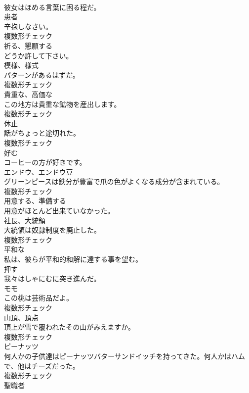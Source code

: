 \documentclass[8pt]{extreport}
\begin{document}
\begin{CJK}{UTF8}{min}
\\	彼女はほめる言葉に困る程だ。	
\\	[名詞]	患者	
\\	辛抱しなさい。	
\\	複数形チェック
\\	[動詞]	祈る、懇願する	
\\	どうか許して下さい。	
\\	[名詞]	模様、様式	
\\	パターンがあるはずだ。	
\\	複数形チェック
\\	[名詞]	貴重な、高価な	
\\	この地方は貴重な鉱物を産出します。	
\\	複数形チェック
\\	[名詞]	休止	
\\	話がちょっと途切れた。	
\\	複数形チェック
\\	[動詞]	好む	
\\	コーヒーの方が好きです。	
\\	[名詞]	エンドウ、エンドウ豆	
\\	グリーンピースは鉄分が豊富で爪の色がよくなる成分が含まれている。	
\\	複数形チェック
\\	[動詞]	用意する、準備する	
\\	用意がほとんど出来ていなかった。	
\\	[名詞]	社⻑、大統領	
\\	大統領は奴隷制度を廃止した。	
\\	複数形チェック
\\	[形容詞]	平和な	
\\	私は、彼らが平和的和解に達する事を望む。	
\\	[動詞]	押す	
\\	我々はしゃにむに突き進んだ。	
\\	[名詞]	モモ	
\\	この桃は芸術品だよ。	
\\	複数形チェック
\\	[名詞]	山頂、頂点	
\\	頂上が雪で覆われたその山がみえますか。	
\\	複数形チェック
\\	[名詞]	ピーナッツ	
\\	何人かの子供達はピーナッツバターサンドイッチを持ってきた。何人かはハムで、他はチーズだった。	
\\	複数形チェック
\\	[名詞]	聖職者	

\end{CJK}
\end{document}
